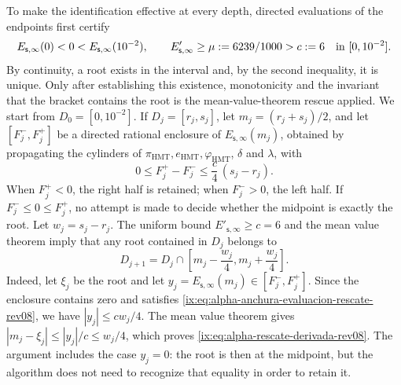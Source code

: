 To make the identification effective at every depth, directed
evaluations of the endpoints first certify
\[
 E_{\mathsf s,\infty}(0)<0<
 E_{\mathsf s,\infty}(10^{-2}),
 \qquad
 E'_{\mathsf s,\infty}\geq\mu:=6239/1000>c:=6
 \quad\hbox{in }[0,10^{-2}].
\]
By continuity, a root exists in the interval and, by the second inequality,
it is unique. Only after establishing this existence, monotonicity and the invariant
that the bracket contains the root is the mean-value-theorem
rescue applied. We start from \(D_0=[0,10^{-2}]\). If
\(D_j=[r_j,s_j]\), let \(m_j=(r_j+s_j)/2\), and let
\([F_j^-,F_j^+]\) be a directed rational enclosure of
\(E_{\mathsf s,\infty}(m_j)\), obtained by propagating the cylinders of
\(\pi_{\mathrm{HMT}},e_{\mathrm{HMT}},\varphi_{\mathrm{HMT}}\),
\(\delta\) and \(\lambda\), with
\begin{equation}
 0\leq F_j^+-F_j^-\leq \frac{c}{4}\,(s_j-r_j).
 \label{ix:eq:alpha-anchura-evaluacion-rescate-rev08}
\end{equation}
When \(F_j^+<0\), the right half is retained;
when \(F_j^->0\), the left half. If
\(F_j^-\leq0\leq F_j^+\), no attempt is made to decide whether the midpoint is
exactly the root. Let \(w_j=s_j-r_j\). The uniform bound
\(E'_{\mathsf s,\infty}\geq c=6\) and the mean value theorem imply that
any root contained in \(D_j\) belongs to
\begin{equation}
 D_{j+1}=D_j\cap
 \left[m_j-\frac{w_j}{4},
             m_j+\frac{w_j}{4}\right].
 \label{ix:eq:alpha-rescate-derivada-rev08}
\end{equation}
Indeed, let \(\xi_j\) be the root and let
\(y_j=E_{\mathsf s,\infty}(m_j)\in[F_j^-,F_j^+]\). Since the enclosure contains
zero and satisfies \eqref{ix:eq:alpha-anchura-evaluacion-rescate-rev08}, we have
\(|y_j|\leq cw_j/4\). The mean value theorem gives
\(|m_j-\xi_j|\leq |y_j|/c\leq w_j/4\), which proves
\eqref{ix:eq:alpha-rescate-derivada-rev08}. The argument includes the case
\(y_j=0\): the root is then at the midpoint, but the algorithm does not
need to recognize that equality in order to retain it.

